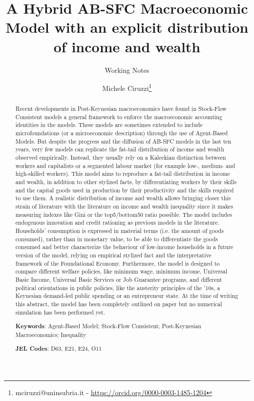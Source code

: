 \documentclass[a4paper, headings=standardclasses]{scrartcl}
\title{A Hybrid AB-SFC Macroeconomic Model with an explicit distribution of income and wealth \let\thefootnote\relax\footnotetext{
	This version is intended to be submitted as a working paper to the 2023 STOREP Conference.

	An updated version of this paper and all the source code and the instructions required to replicate the paper will be available at \url{https://github.com/TnTo/FE/}
  }}
\subtitle{Working Notes}
\author{Michele Ciruzzi\thanks{mciruzzi@uninsubria.it - \url{https://orcid.org/0000-0003-1485-1204}}}
\begin{document}
\maketitle

\begin{abstract}
    Recent developments in Post-Keynesian macroeconomics have found in Stock-Flow Consistent models a general framework to enforce the macroeconomic accounting identities in the models.
    These models are sometimes extended to include microfoundations (or a microeconomic description) through the use of Agent-Based Models.
    But despite the progress and the diffusion of AB-SFC models in the last ten years, very few models can replicate the fat-tail distribution of income and wealth observed empirically.
    Instead, they usually rely on a Kaleckian distinction between workers and capitalists or a segmented labour market (for example low-, medium- and high-skilled workers).
    This model aims to reproduce a fat-tail distribution in income and wealth, in addition to other stylized facts, by differentiating workers by their skills and the capital goods used in production by their productivity and the skills required to use them.
    A realistic distribution of income and wealth allows bringing closer this strain of literature with the literature on income and wealth inequality since it makes measuring indexes like Gini or the top5/bottom50 ratio possible.
    The model includes endogenous innovation and credit rationing as previous models in the literature.
    Households' consumption is expressed in material terms (i.e. the amount of goods consumed), rather than in monetary value, to be able to differentiate the goods consumed and better characterize the behaviour of low-income households in a future version of the model, relying on empirical stylized fact and the interpretative framework of the Foundational Economy.
    Furthermore, the model is designed to compare different welfare policies, like minimum wage, minimum income, Universal Basic Income, Universal Basic Services or Job Guarantee programs, and different political orientations in public policies, like the austerity principles of the '10s, a Keynesian demand-led public spending or an entrepreneur state.
    At the time of writing this abstract, the model has been completely outlined on paper but no numerical simulation has been performed yet.

    \textbf{Keywords}: Agent-Based Model; Stock-Flow Consistent; Post-Keynesian Macroeconomics; Inequality

    \textbf{JEL Codes}: D63, E21, E24, O11
\end{abstract}
\end{document}
